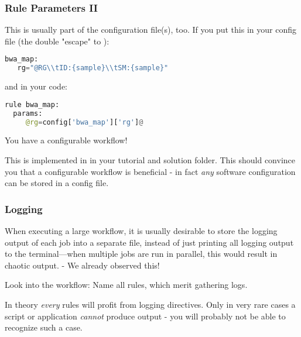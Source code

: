 \begin{frame}[fragile]
  \frametitle{Rule Parameters II}
  This is usually part of the configuration file(s), too.\newline
  If you put this in your config file (the double \altverb{\\} "escape" to \altverb{\t}):
  \begin{lstlisting}[language=Python,style=Python]
bwa_map:
   rg="@RG\\tID:{sample}\\tSM:{sample}"
  \end{lstlisting}
  and in your code:
  \begin{lstlisting}[language=Python,style=Python]
rule bwa_map:
  params:
     @rg=config['bwa_map']['rg']@
  \end{lstlisting}
  You have a configurable workflow! 
  \begin{hint}
  	This is implemented in  in your tutorial and solution folder. This should convince you that a configurable workflow is beneficial - in fact \emph{any} software configuration can be stored in a config file.
  \end{hint}
\end{frame}

\begin{frame}
  \frametitle{Logging}
  \begin{hint}
  	When executing a large workflow, it is usually desirable to store the logging output of each job into a separate file, instead of just printing all logging output to the terminal—when multiple jobs are run in parallel, this would result in chaotic output. - We already observed this!
  \end{hint}
  \pause
  \begin{task}
  	Look into the workflow: Name all rules, which merit gathering logs.
  \end{task}
  \pause
  \begin{docs}
  	In theory \emph{every} rules will profit from logging directives. Only in very rare cases a script or application \emph{cannot} produce output - you will probably not be able to recognize such a case.
  \end{docs}
\end{frame}


